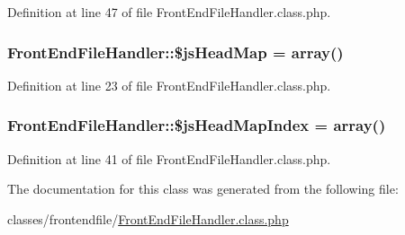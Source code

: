 Definition at line 47 of file Front\-End\-File\-Handler.\-class.\-php.

\hypertarget{classFrontEndFileHandler_ab434f9c8c874aaf8186e259dff95d116}{
\subsubsection[{\$js\-Head\-Map}]{\setlength{\rightskip}{0pt plus 5cm}Front\-End\-File\-Handler\-::\$js\-Head\-Map = array()}}\label{classFrontEndFileHandler_ab434f9c8c874aaf8186e259dff95d116}


Definition at line 23 of file Front\-End\-File\-Handler.\-class.\-php.

\hypertarget{classFrontEndFileHandler_a151a55b31ffaec411a86b7f618eed4ac}{
\subsubsection[{\$js\-Head\-Map\-Index}]{\setlength{\rightskip}{0pt plus 5cm}Front\-End\-File\-Handler\-::\$js\-Head\-Map\-Index = array()}}\label{classFrontEndFileHandler_a151a55b31ffaec411a86b7f618eed4ac}


Definition at line 41 of file Front\-End\-File\-Handler.\-class.\-php.



The documentation for this class was generated from the following file\-:\begin{DoxyCompactItemize}
\item 
classes/frontendfile/\hyperlink{FrontEndFileHandler_8class_8php}{Front\-End\-File\-Handler.\-class.\-php}\end{DoxyCompactItemize}
